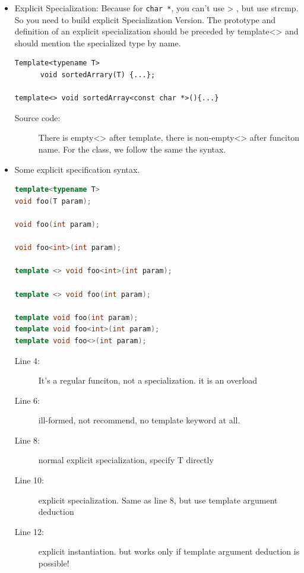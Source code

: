 \documentclass[a4paper,11pt,twoside]{book}
\begin{document}
\begin{itemize}

	\item Explicit Specialization: Because for \texttt{char *}, you can't use > , but use strcmp.  So you need to build explicit Specialization Version. The prototype and definition of an explicit specialization should be preceded by template<> and should mention the specialized type by name.
	
\begin{lstlisting}[numbers=none]
Template<typename T>
      void sortedArrary(T) {...};

template<> void sortedArray<const char *>(){...}
\end{lstlisting}
\begin{description}
	\item[Source code:] There is empty<> after template, there is non-empty<> after funciton name. For the class, we follow the same the syntax.
\end{description}

\item Some explicit specification syntax.
\begin{lstlisting}[frame=single, language=c++]
template<typename T>
void foo(T param);

void foo(int param);

void foo<int>(int param);

template <> void foo<int>(int param);

template <> void foo(int param); 

template void foo(int param);  
template void foo<int>(int param); 
template void foo<>(int param); 
\end{lstlisting}
\begin{description}
	\item[Line 4:] It's a regular funciton, not a specialization. it is an overload
	
	\item[Line 6:] ill-formed, not recommend, no template keyword at all.
	
	\item[Line 8:] normal explicit specialization, specify T directly
	
	\item[Line 10:] explicit specialization. Same as line 8, but use template argument deduction
	
	\item[Line 12:] explicit instantiation. but works only if template argument deduction is possible!
	

\end{description}
\end{itemize}
\end{document}

